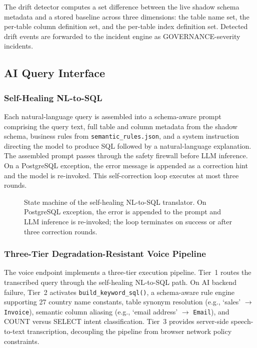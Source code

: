 \documentclass[12pt,a4paper]{report}
\begin{document}
The drift detector computes a set difference between the live shadow schema metadata and a stored baseline across three dimensions: the table name set, the per-table column definition set, and the per-table index definition set. Detected drift events are forwarded to the incident engine as GOVERNANCE-severity incidents.

\subsection{AI Query Interface}

\subsubsection{Self-Healing NL-to-SQL}

Each natural-language query is assembled into a schema-aware prompt comprising the query text, full table and column metadata from the shadow schema, business rules from \texttt{semantic\_rules.json}, and a system instruction directing the model to produce SQL followed by a natural-language explanation. The assembled prompt passes through the safety firewall before LLM inference. On a PostgreSQL exception, the error message is appended as a correction hint and the model is re-invoked. This self-correction loop executes at most three rounds.

\begin{figure}[htbp]
    \centering
    \fbox{\rule{0pt}{5cm}\rule{\textwidth}{0pt}}
    \caption{State machine of the self-healing NL-to-SQL translator. On PostgreSQL exception, the error is appended to the prompt and LLM inference is re-invoked; the loop terminates on success or after three correction rounds.}
    \label{fig:nlsql}
\end{figure}

\subsubsection{Three-Tier Degradation-Resistant Voice Pipeline}

The voice endpoint implements a three-tier execution pipeline. Tier~1 routes the transcribed query through the self-healing NL-to-SQL path. On AI backend failure, Tier~2 activates \texttt{build\_keyword\_sql()}, a schema-aware rule engine supporting 27 country name constants, table synonym resolution (e.g., `sales' $\to$ \texttt{Invoice}), semantic column aliasing (e.g., `email address' $\to$ \texttt{Email}), and COUNT versus SELECT intent classification. Tier~3 provides server-side speech-to-text transcription, decoupling the pipeline from browser network policy constraints.
\end{document}
